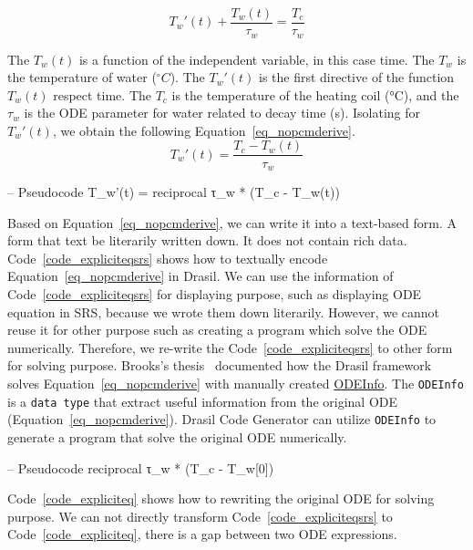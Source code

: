 \begin{equation} \label{eq_nopcmorginal}
	T_{w}'(t) +  \frac {T_{w}(t)}{\tau_{w}} = \frac{T_{c}}{\tau_{w}}
\end{equation}

The $T_w(t)$ is a function of the independent variable, in this case time. The $T_w$ is the temperature of water ($ ^\circ C $). The $T_w'(t)$ is the first directive of the function $T_w(t)$ respect time. The $T_c$ is the temperature of the heating coil (°C), and the $\tau_w$ is the ODE parameter for water related to decay time (s). Isolating for $T_w'(t)$, we obtain the following Equation~\ref{eq_nopcmderive}.
\begin{equation} \label{eq_nopcmderive}
	T_{w}'(t) = \frac{T_{c} - T_{w}(t)}{\tau_{w}}
\end{equation}

\begin{listing}[ht]
\begin{haskell1}
-- Pseudocode
T_w'(t) = reciprocal τ_w * (T_c - T_w(t))
\end{haskell1}
\label{code_expliciteqsrs}
\end{listing}

Based on Equation~\ref{eq_nopcmderive}, we can write it into a text-based form. A form that text be literarily written down. It does not contain rich data. Code~\ref{code_expliciteqsrs} shows how to textually encode Equation~\ref{eq_nopcmderive} in Drasil. We can use the information of Code~\ref{code_expliciteqsrs} for displaying purpose, such as displaying ODE equation in SRS, because we wrote them down literarily. However, we cannot reuse it for other purpose such as creating a program which solve the ODE numerically. Therefore, we re-write the Code~\ref{code_expliciteqsrs} to other form for solving purpose. Brooks's thesis~\citep{brooks} documented how the Drasil framework solves Equation~\ref{eq_nopcmderive} with manually created \href{https://jacquescarette.github.io/Drasil/docs/drasil-code-0.1.9.0/Language-Drasil-Code.html#t:ODEInfo}{ODEInfo}. The \verb|ODEInfo| is a \verb|data type| that extract useful information from the original ODE (Equation~\ref{eq_nopcmderive}). Drasil Code Generator can utilize \verb|ODEInfo| to generate a program that solve the original ODE numerically. 
\begin{listing}[ht]
\begin{haskell1}
-- Pseudocode
reciprocal τ_w * (T_c - T_w[0])
\end{haskell1}
\label{code_expliciteq}
\end{listing}
Code~\ref{code_expliciteq} shows how to rewriting the original ODE for solving purpose. We can not directly transform Code~\ref{code_expliciteqsrs} to Code~\ref{code_expliciteq}, there is a gap between two ODE expressions.

